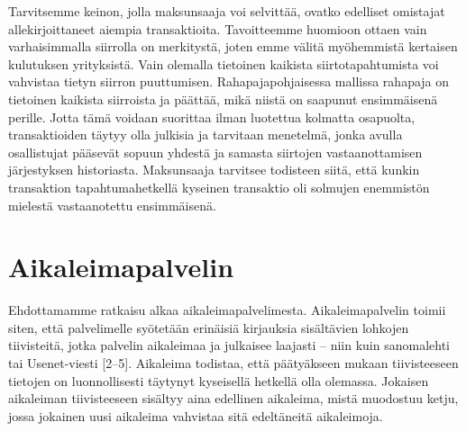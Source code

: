 \documentclass{article}
\begin{document}
Tarvitsemme keinon, jolla maksunsaaja voi selvittää, ovatko e\-del\-li\-set omistajat allekirjoittaneet aiempia transaktioita. Tavoitteemme huomioon ottaen vain varhaisimmalla siirrolla on merkitystä, joten emme välitä myö\-hem\-mis\-tä kertaisen kulutuksen yrityksistä. Vain olemalla tietoinen kaikista siirtotapahtumista voi vahvistaa tietyn siirron puuttumisen. Rahapajapohjaisessa mallissa rahapaja on tietoinen kaikista siirroista ja päättää, mikä niistä on saapunut ensimmäisenä perille. Jotta tämä voidaan suorittaa ilman luotettua kolmatta osapuolta, transaktioiden täytyy olla julkisia \cite{1} ja tarvitaan menetelmä, jonka avulla osallistujat pääsevät sopuun yhdestä ja samasta siirtojen vastaanottamisen järjestyksen historiasta. Maksunsaaja tarvitsee todisteen siitä, että kunkin transaktion tapahtumahetkellä kyseinen transaktio oli solmujen enemmistön mielestä vastaanotettu ensimmäisenä.

\section{Aikaleimapalvelin}

Ehdottamamme ratkaisu alkaa aikaleimapalvelimesta. Aikaleimapalvelin toimii siten, että palvelimelle syötetään erinäisiä kirjauksia sisältävien lohkojen tiivisteitä, jotka palvelin aikaleimaa ja julkaisee laajasti – niin kuin sanomalehti tai Usenet-viesti [2–5]. Aikaleima todistaa, että päätyäkseen mukaan tiivisteeseen tietojen on luonnollisesti täytynyt kyseisellä hetkellä olla olemassa. Jokaisen aikaleiman tiivisteeseen sisältyy aina edellinen aikaleima, mistä muodostuu ketju, jossa jokainen uusi aikaleima vahvistaa sitä edeltäneitä aikaleimoja.
\end{document}
